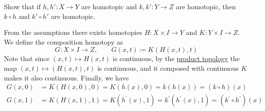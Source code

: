   \begin{exercise}[Munkres 51.1]
    Show that if $h, h' : X \to Y$ are homotopic and $k, k' : Y \to Z$ are homotopic, then $k \circ h \text{ and } k' \circ h'$ are homotopic.
  \end{exercise}
  \begin{solution}
    From the assumptions there exists homotopies $H: X \times I \rightarrow Y$ and $K: Y \times I \rightarrow Z$. We define the composition homotopy as 
    \begin{equation}
      G: X \times I \rightarrow Z, \qquad G(x, t) \coloneqq K(H(x, t), t)
    \end{equation}
    Note that since $(x, t) \mapsto H(x, t)$ is continuous, by the \hyperref[pst-def:product-topology]{product topology} the map $(x, t) \mapsto (H(x, t), t)$ is continuous, and it composed with continuous $K$ makes it also continuous. Finally, we have 
    \begin{align}
      G(x, 0) & = K(H(x, 0), 0) = K(h(x), 0) = k(h(x)) = (k \circ h) (x) \\ 
      G(x, 1) & = K(H(x, 1), 1) = K(h^\prime (x), 1) = k^\prime (h^\prime (x), 1) = (k^\prime \circ h^\prime) (x)
    \end{align}
  \end{solution}

